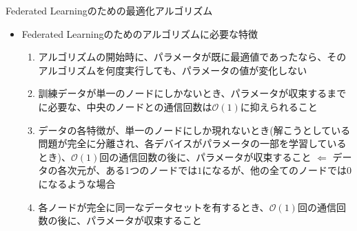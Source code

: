 \documentclass[dvipdfmx,notheorems,t]{beamer}
\begin{document}
\begin{frame}{Federated Learningのための最適化アルゴリズム}

\begin{itemize}
	\item Federated Learningのためのアルゴリズムに必要な特徴
	\begin{enumerate}
		\item アルゴリズムの開始時に、パラメータが既に最適値であったなら、そのアルゴリズムを何度実行しても、パラメータの値が変化しない \label{enum:fl-algorithm-feature-a}
		\newline
		\item 訓練データが単一のノードにしかないとき、パラメータが収束するまでに必要な、中央のノードとの通信回数は$\mathcal{O}(1)$に抑えられること \label{enum:fl-algorithm-feature-b}
		\newline
		\item データの各特徴が、単一のノードにしか現れないとき(解こうとしている問題が完全に分離され、各デバイスがパラメータの一部を学習しているとき)、$\mathcal{O}(1)$回の通信回数の後に、パラメータが収束すること \label{enum:fl-algorithm-feature-c} \newline \newline
		$\Leftarrow$ データの各次元が、ある1つのノードでは$1$になるが、他の全てのノードでは$0$になるような場合
		\newline
		\item 各ノードが完全に同一なデータセットを有するとき、$\mathcal{O}(1)$回の通信回数の後に、パラメータが収束すること \label{enum:fl-algorithm-feature-d}
	\end{enumerate}
\end{itemize}

\end{frame}
\end{document}
